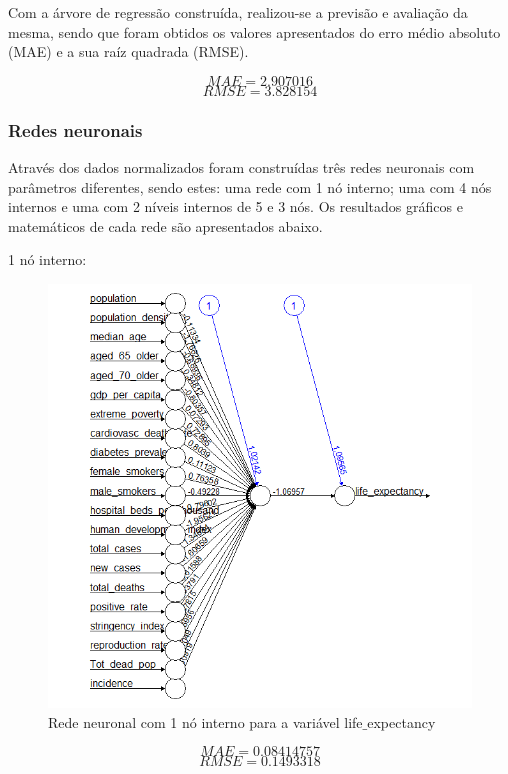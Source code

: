 \documentclass[conference]{IEEEtran}
\begin{document}
Com a árvore de regressão construída, realizou-se a previsão e avaliação da mesma, sendo que foram obtidos os valores apresentados do erro médio absoluto (MAE) e a sua raíz quadrada (RMSE).

\begin{equation}
MAE=2.907016\label{4b_mae}
\end{equation}
\begin{equation}
RMSE=3.828154\label{4b_rmse}
\end{equation}


\subsubsection{Redes neuronais}
Através dos dados normalizados foram construídas três redes neuronais com parâmetros diferentes, sendo estes: uma rede com 1 nó interno; uma com 4 nós internos e uma com 2 níveis internos de 5 e 3 nós. Os resultados gráficos e matemáticos de cada rede são apresentados abaixo.

1 nó interno:
\begin{figure}[htbp]
\centerline{\includegraphics[width=0.95\columnwidth]{images/04_3.png}}
\caption{Rede neuronal com 1 nó interno para a variável life$\_$expectancy}
\label{4c1}
\end{figure}
\begin{equation}
MAE=0.08414757\label{4c1_mae}
\end{equation}
\begin{equation}
RMSE=0.1493318\label{4c1_rmse}
\end{equation}
\end{document}

